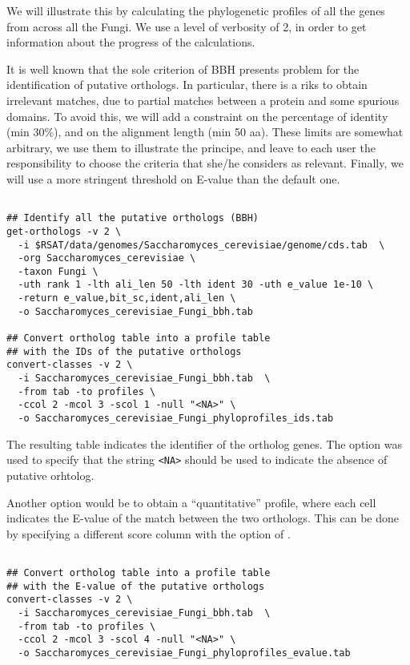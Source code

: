 We will illustrate this by calculating the phylogenetic profiles of
all the genes from  across all the
Fungi. We use a level of verbosity of 2, in order to get information
about the progress of the calculations.

It is well known that the sole criterion of BBH presents problem for
the identification of putative orthologs. In particular, there is a
riks to obtain irrelevant matches, due to partial matches between a
protein and some spurious domains. To avoid this, we will add a
constraint on the percentage of identity (min 30\%), and on the
alignment length (min 50 aa). These limits are somewhat arbitrary, we
use them to illustrate the principe, and leave to each user the
responsibility to choose the criteria that she/he considers as
relevant. Finally, we will use a more stringent threshold on E-value
than the default one.

\begin{small}
\begin{verbatim}

## Identify all the putative orthologs (BBH)
get-orthologs -v 2 \
  -i $RSAT/data/genomes/Saccharomyces_cerevisiae/genome/cds.tab  \
  -org Saccharomyces_cerevisiae \
  -taxon Fungi \
  -uth rank 1 -lth ali_len 50 -lth ident 30 -uth e_value 1e-10 \
  -return e_value,bit_sc,ident,ali_len \
  -o Saccharomyces_cerevisiae_Fungi_bbh.tab

## Convert ortholog table into a profile table
## with the IDs of the putative orthologs
convert-classes -v 2 \
  -i Saccharomyces_cerevisiae_Fungi_bbh.tab  \
  -from tab -to profiles \
  -ccol 2 -mcol 3 -scol 1 -null "<NA>" \
  -o Saccharomyces_cerevisiae_Fungi_phyloprofiles_ids.tab

\end{verbatim}
\end{small}


The resulting table indicates the identifier of the ortholog
genes. The option \option{-null} was used to specify that the string
\texttt{<NA>} should be used to indicate the absence of putative
orhtolog.

Another option would be to obtain a ``quantitative'' profile, where
each cell indicates the E-value of the match between the two
orthologs. This can be done by specifying a different score column
with the option  of .

\begin{small}
\begin{verbatim}

## Convert ortholog table into a profile table
## with the E-value of the putative orthologs
convert-classes -v 2 \
  -i Saccharomyces_cerevisiae_Fungi_bbh.tab  \
  -from tab -to profiles \
  -ccol 2 -mcol 3 -scol 4 -null "<NA>" \
  -o Saccharomyces_cerevisiae_Fungi_phyloprofiles_evalue.tab

\end{verbatim}
\end{small}

